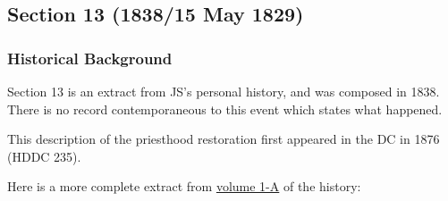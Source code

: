 \subsection{Section 13 (1838/15 May 1829)}
	\label{DC13}
	
	\subsubsection{Historical Background}
		\label{DC13-HB}
		
		Section 13 is an extract from JS's personal history, and was composed in 1838. There is no record contemporaneous to this event which states what happened. 
		
		This description of the priesthood restoration first appeared in the DC in 1876 (HDDC 235).
		
		Here is a more complete extract from \href{https://www.josephsmithpapers.org/paper-summary/history-1838-1856-volume-a-1-23-december-1805-30-august-1834/23}{volume 1-A} of the history:
		
